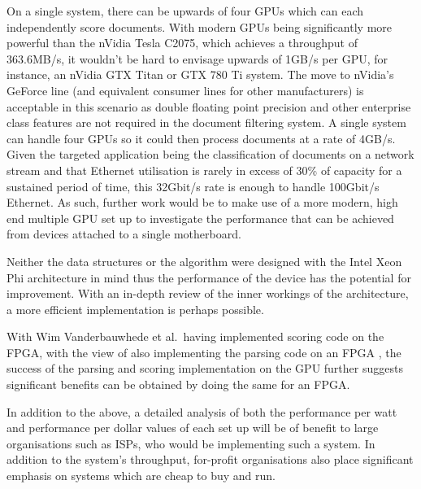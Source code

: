 On a single system, there can be upwards of four GPUs which can each
independently score documents. With modern GPUs being significantly more
powerful than the nVidia Tesla C2075, which achieves a throughput of 363.6MB/s,
it wouldn't be hard to envisage upwards of 1GB/s per GPU, for instance, an
nVidia GTX Titan or GTX 780 Ti system. The move to nVidia's GeForce line (and
equivalent consumer lines for other manufacturers) is acceptable in this
scenario as double floating point precision and other enterprise class features
are not required in the document filtering system. A single system can handle
four GPUs so it could then process documents at a rate of 4GB/s. Given the
targeted application being the classification of documents on a network stream
and that Ethernet utilisation is rarely in excess of 30\% of capacity for a
sustained period of time, this 32Gbit/s rate is enough to handle 100Gbit/s
Ethernet. As such, further work would be to make use of a more modern, high end
multiple GPU set up to investigate the performance that can be achieved from
devices attached to a single motherboard.

Neither the data structures or the algorithm were designed with the Intel Xeon
Phi architecture in mind thus the performance of the device has the potential
for improvement. With an in-depth review of the inner workings of the
architecture, a more efficient implementation is perhaps possible.

With Wim Vanderbauwhede et al.\ having implemented scoring code on the FPGA,
with the view of also implementing the parsing code on an FPGA
\cite{HybridCPUFPGA}, the success of the parsing and scoring implementation on
the GPU further suggests significant benefits can be obtained by doing the same
for an FPGA.

In addition to the above, a detailed analysis of both the performance per watt
and performance per dollar values of each set up will be of benefit to large
organisations such as ISPs, who would be implementing such a system. In addition
to the system's throughput, for-profit organisations also place significant
emphasis on systems which are cheap to buy and run.
